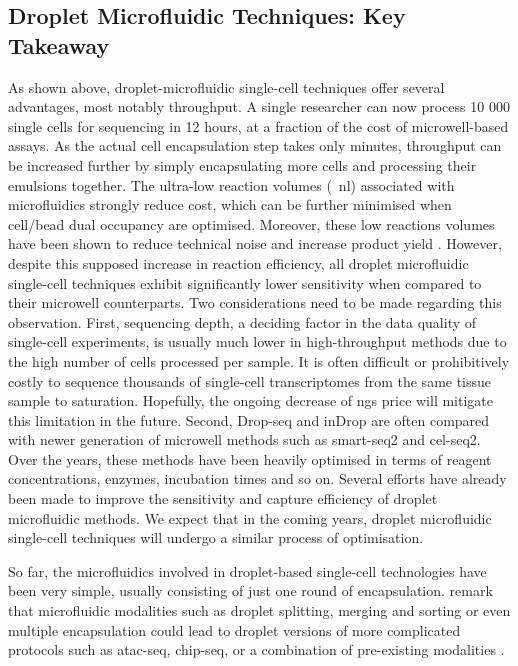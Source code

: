 \subsection{Droplet Microfluidic Techniques: Key Takeaway}
As shown above, droplet-microfluidic single-cell techniques offer several advantages, most notably throughput. A single researcher can now process 10 000 single cells for sequencing in 12 hours, at a fraction of the cost of microwell-based assays. As the actual cell encapsulation step takes only minutes, throughput can be increased further by simply encapsulating more cells and processing their emulsions together. The ultra-low reaction volumes (\SI{}{\nano\litre}) associated with microfluidics strongly reduce cost, which can be further minimised when cell/bead dual occupancy are optimised. Moreover, these low reactions volumes have been shown to reduce technical noise and increase product yield \citep{streets2014}. However, despite this supposed increase in reaction efficiency, all droplet microfluidic single-cell techniques exhibit significantly lower sensitivity when compared to their microwell counterparts. Two considerations need to be made regarding this observation. First, sequencing depth, a deciding factor in the data quality of single-cell experiments, is usually much lower in high-throughput methods due to the high number of cells processed per sample. It is often difficult or prohibitively costly to sequence thousands of single-cell transcriptomes from the same tissue sample to saturation. Hopefully, the ongoing decrease of \acrshort{ngs} price will mitigate this limitation in the future. Second, Drop-seq and inDrop are often compared with newer generation of microwell methods such as \acrshort{smart-seq}2 and \acrshort{cel-seq}2. Over the years, these methods have been heavily optimised in terms of reagent concentrations, enzymes, incubation times and so on. Several efforts have already been made to improve the sensitivity and capture efficiency of droplet microfluidic methods. We expect that in the coming years, droplet microfluidic single-cell techniques will undergo a similar process of optimisation.\pms

%
So far, the microfluidics involved in droplet-based single-cell technologies have been very simple, usually consisting of just one round of encapsulation. \citeauthor{zilionis2017} remark that microfluidic modalities such as droplet splitting, merging and sorting or even multiple encapsulation could lead to droplet versions of more complicated protocols such as \acrshort{atac-seq}, \acrshort{chip-seq}, or a combination of pre-existing modalities \citep{zilionis2017, ahn2006a, ahn2006b}.\pms

